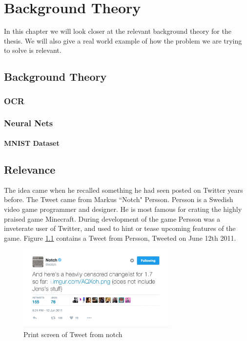 
\chapter{Background Theory}
\label{ch:background}
In this chapter we will look closer at the relevant background theory for the thesis. We will also give a real world example of how the problem we are trying to solve is relevant.


\section{Background Theory}

\subsection{OCR}

\subsection{Neural Nets}

\subsubsection{MNIST Dataset}


\section{Relevance}
The idea came when he recalled something he had seen posted on Twitter years before. The Tweet came from Markus ``Notch" Persson. Persson is a Swedish video game programmer and designer. He is most famous for crating the highly praised game Minecraft. During development of the game Persson was a inveterate user of Twitter, and used to hint or tease upcoming features of the game. Figure \ref{ref:notch_twitter} contains a Tweet from Persson, Tweeted on June 12th 2011.

\begin{figure}[ht]
    \centering
    \includegraphics[width=0.7\textwidth]{fig/chapter1/notch_tweet.png}
    \caption[Print screen of Tweet from notch]{Print screen of Tweet from notch\protect\footnotemark}
    \label{ref:notch_twitter}
\end{figure}


